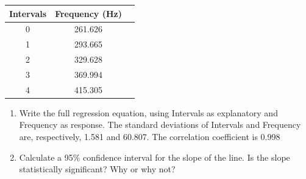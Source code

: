 \documentclass[11pt, chapterprefix=true]{scrbook}\usepackage[]{graphicx}\usepackage[]{color}
\begin{document}
\begin{exercises}
\begin{exercise}
\begin{center}
\begin{tabular}{@{} ccc @{}} \hline
Intervals &	Frequency (Hz) \\ \hline
0&	261.626 \\
1&	293.665 \\
2&	329.628 \\
3&	369.994 \\
4&	415.305 \\ \hline
\end{tabular}
\end{center}

\begin{enumerate}
  \item Write the full regression equation, using Intervals as explanatory and Frequency as response. The standard deviations of Intervals and Frequency are, respectively, 1.581 and 60.807. The correlation coefficient is 0.998

  \item	Calculate a 95\% confidence interval for the slope of the line. Is the slope statistically significant?  Why or why not?
\end{enumerate}

\end{exercise}
\begin{solution}  %

\end{solution}




\end{exercises}
\end{document}
